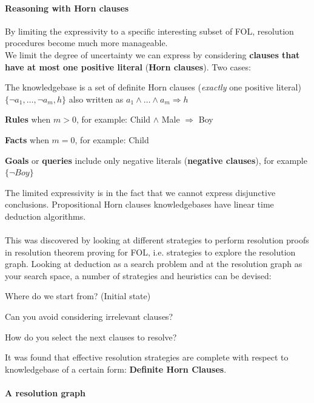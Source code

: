 \documentclass[10pt]{report}
\begin{document}
\paragraph{Reasoning with Horn clauses} By limiting the expressivity to a specific interesting subset of FOL, resolution procedures become much more manageable.\\
We limit the degree of uncertainty we can express by considering \textbf{clauses that have at most one positive literal} (\textbf{Horn clauses}). Two cases:
\begin{list}{}{}
	\item The knowledgebase is a set of definite Horn clauses (\textit{exactly} one positive literal)\\
	$\{\neg a_1,\ldots,\neg a_m, h\}$ also written as $a_1\wedge\ldots\wedge a_m \Rightarrow h$
	\begin{list}{}{}
		\item \textbf{Rules} when $m>0$, for example: Child $\wedge$ Male $\Rightarrow$ Boy
		\item \textbf{Facts} when $m=0$, for example: Child
	\end{list}
	\item \textbf{Goals} or \textbf{queries} include only negative literals (\textbf{negative clauses}), for example $\{\neg Boy\}$
\end{list}
The limited expressivity is in the fact that we cannot express disjunctive conclusions. Propositional Horn clauses knowledgebases have linear time deduction algorithms.\\\\
This was discovered by looking at different strategies to perform resolution proofs in resolution theorem proving for FOL, i.e. strategies to explore the resolution graph. Looking at deduction as a search problem and at the resolution graph as your search space, a number of strategies and heuristics can be devised:
\begin{list}{}{}
	\item Where do we start from? (Initial state)
	\item Can you avoid considering irrelevant clauses?
	\item How do you select the next clauses to resolve?
\end{list}
It was found that effective resolution strategies are complete with respect to knowledgebase of a certain form: \textbf{Definite Horn Clauses}.
\paragraph{A resolution graph}
\begin{center}
\end{center}
\end{document}
